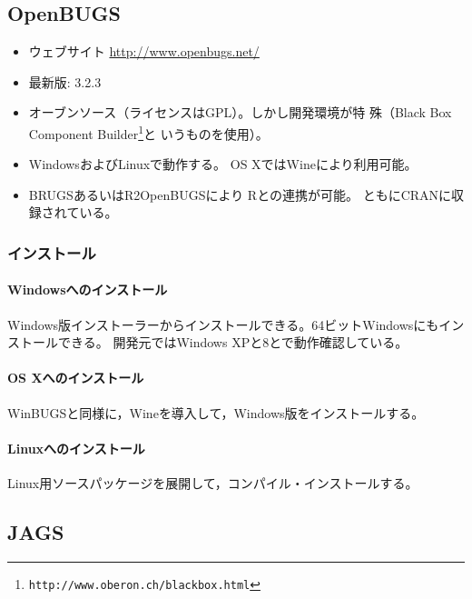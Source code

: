 \documentclass[11pt,uplatex]{jsarticle}
\begin{document}
\subsection{OpenBUGS}

\begin{itemize}
\item ウェブサイト \url{http://www.openbugs.net/}
\item 最新版: 3.2.3
\item オーブンソース（ライセンスはGPL）。しかし開発環境が特
  殊（Black Box Component Builder\footnote{\texttt{http://www.oberon.ch/blackbox.html}}と
  いうものを使用）。
\item WindowsおよびLinuxで動作する。
OS Xでは\textsf{Wine}により利用可能。
\item \textsf{BRUGS}あるいは\textsf{R2OpenBUGS}により
\textsf{R}との連携が可能\cite{Thomas}。
ともにCRANに収録されている。
\end{itemize}

\subsubsection*{インストール}
\paragraph{Windowsへのインストール}
Windows版インストーラーからインストールできる。64ビットWindowsにもインストールできる。
開発元ではWindows XPと8とで動作確認している。

\paragraph{OS Xへのインストール}
\textsf{WinBUGS}と同様に，\textsf{Wine}を導入して，Windows版をインストールする。

\paragraph{Linuxへのインストール}
Linux用ソースパッケージを展開して，コンパイル・インストールする。

\subsection{JAGS}
\end{document}

